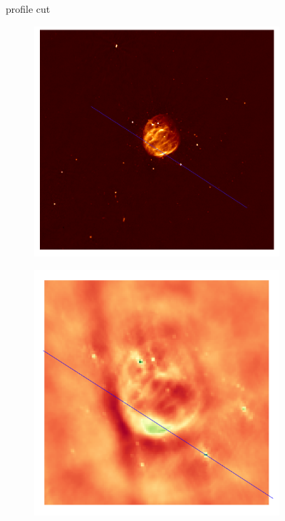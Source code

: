 \begin{figure}
	\centering

	\caption{profile cut}
\end{figure}

\begin{figure}
	\centering
	\begin{subfigure}[b]{0.3\linewidth}
		\includegraphics[width=\linewidth, trim={180px 170px 170px 146px}, clip]{./chapters/05.results/pic_G55_7_lined.png}
	\end{subfigure}
	\begin{subfigure}[b]{0.3\linewidth}
		\includegraphics[width=\linewidth, trim={18px 19px 18px 18px}, clip]{./chapters/05.results/raw_image_lined.png}
	\end{subfigure}


\end{figure}
